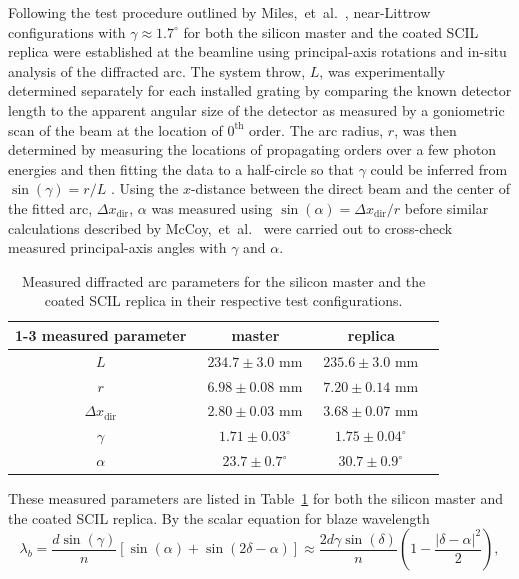 \documentclass{osa-article}
\begin{document}
Following the test procedure outlined by Miles,~et~al.~\cite{Miles18}, near-Littrow configurations with $\gamma \approx 1.7^{\circ}$ for both the silicon master and the coated SCIL replica were established at the beamline using principal-axis rotations and in-situ analysis of the diffracted arc. 
The system throw, $L$, was experimentally determined separately for each installed grating by comparing the known detector length to the apparent angular size of the detector as measured by a goniometric scan of the beam at the location of $0^{\text{th}}$ order. 
The arc radius, $r$, was then determined by measuring the locations of propagating orders over a few photon energies and then fitting the data to a half-circle so that $\gamma$ could be inferred from $\sin \left( \gamma \right) = r / L$ \cite{Miles18,McCoy20}. 
Using the $x$-distance between the direct beam and the center of the fitted arc, $\Delta x_{\text{dir}}$, $\alpha$ was measured using $\sin \left( \alpha \right) = \Delta x_{\text{dir}} / r$ before similar calculations described by McCoy,~et~al.~\cite{McCoy20} were carried out to cross-check measured principal-axis angles with $\gamma$ and $\alpha$. 
\begin{table}[t]
 \centering
 \begin{tabular}{cccc}
 \cline{1-3}
 measured parameter               & \ master         		  & \ replica                  \\ \hline
 $L$                              & \ $234.7 \pm 3.0$ mm      & \ $235.6 \pm 3.0$ mm       \\
 $r$                              & \ $6.98 \pm 0.08$ mm      & \ $7.20 \pm 0.14$ mm       \\
 $\Delta x_{\text{dir}}$ 		  & \ $2.80 \pm 0.03$ mm      & \ $3.68 \pm 0.07$ mm       \\
 $\gamma$             			  & \ $1.71 \pm 0.03^{\circ}$ & \ $1.75 \pm 0.04^{\circ}$  \\
 $\alpha$            			  & \ $23.7 \pm 0.7^{\circ}$  & \ $30.7 \pm 0.9^{\circ}$   \\ \hline
 \end{tabular}
 \caption{Measured diffracted arc parameters for the silicon master and the coated SCIL replica in their respective test configurations.}\label{tab:arc_params}
 \end{table}
These measured parameters are listed in Table~\ref{tab:arc_params} for both the silicon master and the coated SCIL replica. 
By the scalar equation for blaze wavelength
\begin{equation}\label{eq:blaze_wavelength}
 \lambda_b = \frac{d \sin \left( \gamma \right)}{n} \left[\sin \left( \alpha \right) + \sin \left( 2 \delta - \alpha \right) \right] \approx \frac{2 d \gamma \sin \left( \delta \right)}{n} \left( 1 - \frac{|\delta - \alpha|^2}{2} \right),
 \end{equation}
\end{document}
